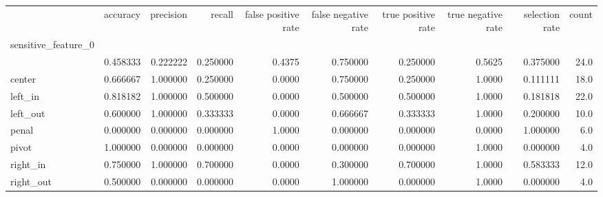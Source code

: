 \begin{tabular}{lrrrrrrrrr}
\toprule
{} &  accuracy &  precision &    recall &  false positive rate &  false negative rate &  true positive rate &  true negative rate &  selection rate &  count \\
sensitive\_feature\_0 &           &            &           &                      &                      &                     &                     &                 &        \\
\midrule
                    &  0.458333 &   0.222222 &  0.250000 &               0.4375 &             0.750000 &            0.250000 &              0.5625 &        0.375000 &   24.0 \\
center              &  0.666667 &   1.000000 &  0.250000 &               0.0000 &             0.750000 &            0.250000 &              1.0000 &        0.111111 &   18.0 \\
left\_in             &  0.818182 &   1.000000 &  0.500000 &               0.0000 &             0.500000 &            0.500000 &              1.0000 &        0.181818 &   22.0 \\
left\_out            &  0.600000 &   1.000000 &  0.333333 &               0.0000 &             0.666667 &            0.333333 &              1.0000 &        0.200000 &   10.0 \\
penal               &  0.000000 &   0.000000 &  0.000000 &               1.0000 &             0.000000 &            0.000000 &              0.0000 &        1.000000 &    6.0 \\
pivot               &  1.000000 &   0.000000 &  0.000000 &               0.0000 &             0.000000 &            0.000000 &              1.0000 &        0.000000 &    4.0 \\
right\_in            &  0.750000 &   1.000000 &  0.700000 &               0.0000 &             0.300000 &            0.700000 &              1.0000 &        0.583333 &   12.0 \\
right\_out           &  0.500000 &   0.000000 &  0.000000 &               0.0000 &             1.000000 &            0.000000 &              1.0000 &        0.000000 &    4.0 \\
\bottomrule
\end{tabular}
